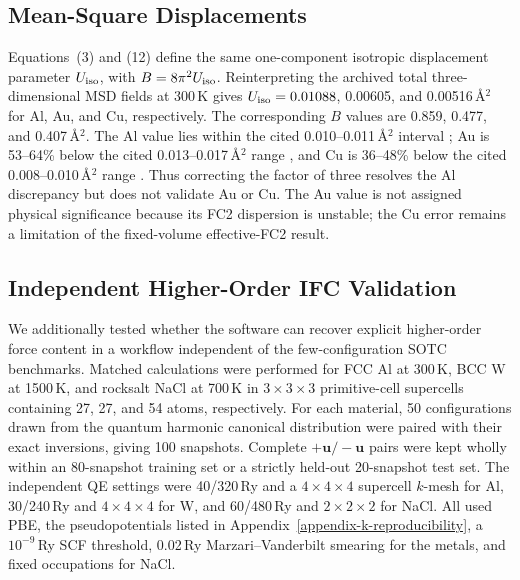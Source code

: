\documentclass[aps,prb,reprint,amsmath,amssymb,floatfix]{revtex4-2}
\begin{document}
\subsection{Mean-Square Displacements}\label{mean-square-displacements}

\color{revisionblue}
Equations~(3) and (12) define the same one-component isotropic displacement
parameter \(U_{\rm iso}\), with \(B=8\pi^2U_{\rm iso}\). Reinterpreting the archived total three-dimensional MSD fields at 300\,K gives \(U_{\rm iso}=0.01088\),
0.00605, and 0.00516\,\AA\(^2\) for Al, Au, and Cu, respectively. The
corresponding \(B\) values are 0.859, 0.477, and 0.407\,\AA\(^2\). The Al
value lies within the cited 0.010--0.011\,\AA\(^2\) interval
\cite{ref36}; Au is 53--64\% below the cited 0.013--0.017\,\AA\(^2\)
range \cite{ref37}, and Cu is 36--48\% below the cited
0.008--0.010\,\AA\(^2\) range \cite{ref38}. Thus correcting the factor of
three resolves the Al discrepancy but does not validate Au or Cu. The Au value
is not assigned physical significance because its FC2 dispersion is unstable;
the Cu error remains a limitation of the fixed-volume effective-FC2 result.
\color{black}

\color{revisionblue}
\subsection{Independent Higher-Order IFC
Validation}\label{independent-higher-order-ifc-validation}
\color{black}

\color{revisionblue}
We additionally tested whether the software can recover explicit higher-order
force content in a workflow independent of the few-configuration SOTC
benchmarks.  Matched calculations were performed for FCC Al at 300\,K, BCC W
at 1500\,K, and rocksalt NaCl at 700\,K in \(3\times3\times3\)
primitive-cell supercells containing 27, 27, and 54 atoms, respectively.
For each material, 50 configurations drawn from the quantum harmonic canonical
distribution were paired with their exact inversions, giving 100 snapshots.
Complete \(+\mathbf u/-\mathbf u\) pairs were kept wholly within an
80-snapshot training set or a strictly held-out 20-snapshot test set.
The independent QE settings were 40/320\,Ry and a \(4\times4\times4\)
supercell \(k\)-mesh for Al, 30/240\,Ry and \(4\times4\times4\) for W,
and 60/480\,Ry and \(2\times2\times2\) for NaCl. All used PBE, the
pseudopotentials listed in Appendix~\ref{appendix-k-reproducibility}, a
\(10^{-9}\)\,Ry SCF threshold, 0.02\,Ry Marzari--Vanderbilt smearing for
the metals, and fixed occupations for NaCl.
\color{black}
\end{document}
